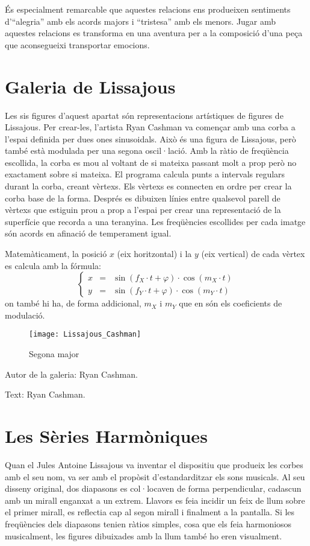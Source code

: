 És especialment remarcable que aquestes relacions ens produeixen sentiments d'``alegria'' amb els acords majors i ``tristesa'' amb els menors. Jugar amb aquestes relacions es transforma en una aventura per a la composició d'una peça que aconsegueixi transportar emocions.


\section{Galeria de Lissajous}
Les sis figures d'aquest apartat són representacions artístiques de figures de Lissajous. Per crear-les, l'artista Ryan Cashman va començar amb una corba a l'espai definida per dues ones sinusoidals. Això és una figura de Lissajous, però també està modulada per una segona oscil·lació. Amb la ràtio de freqüència escollida, la corba es mou al voltant de si mateixa passant molt a prop però no exactament sobre si mateixa. El programa calcula punts a intervals regulars durant la corba, creant vèrtexs. Els vèrtexs es connecten en ordre per crear la corba base de la forma. Després es dibuixen línies entre qualsevol parell de vèrtexs que estiguin prou a prop a l'espai per crear una representació de la superfície que recorda a una teranyina. Les freqüències escollides per cada imatge són acords en afinació de temperament igual.


Matemàticament, la posició $x$ (eix horitzontal) i la $y$ (eix vertical) de cada vèrtex es calcula amb la fórmula:
$$\left\{ \begin{array}{rcl}
x &=& \sin(f_X\cdot t + \varphi) \cdot \cos(m_X \cdot t) \\
y &=& \sin(f_Y\cdot t + \varphi) \cdot \cos(m_Y \cdot t)
\end{array} \right. $$
on també hi ha, de forma addicional, $m_X$ i $m_Y$ que en són els coeficients de modulació.

\begin{figure}[!h]
\centering
\texttt{[image: Lissajous\_Cashman]}
\caption*{Segona major}
\end{figure}


\begin{sectcredits}
\item[Autor de la galeria:] Ryan Cashman.
\item[Text:] Ryan Cashman.
\end{sectcredits}

\section{Les Sèries Harmòniques}
Quan el Jules Antoine Lissajous va inventar el dispositiu que produeix les corbes amb el seu nom, va ser amb el propòsit d'estandarditzar els sons musicals. Al seu disseny original, dos diapasons es col·locaven de forma perpendicular, cadascun amb un mirall enganxat a un extrem. Llavors es feia incidir un feix de llum sobre el primer mirall, es reflectia cap al segon mirall i finalment a la pantalla. Si les freqüències dels diapasons tenien ràtios simples, cosa que els feia harmoniosos musicalment, les figures dibuixades amb la llum també ho eren visualment.

